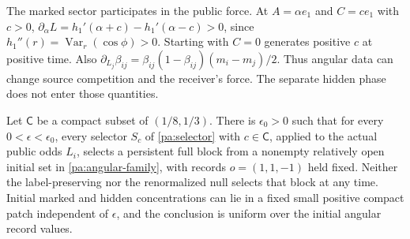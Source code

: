 The marked sector participates in the public force. At $A=\alpha e_1$ and $C=ce_1$ with $c>0$, $\partial_\alpha L=h_1'(\alpha+c)-h_1'(\alpha-c)>0$, since $h_1''(r)=\operatorname{Var}_r(\cos\phi)>0$. Starting with $C=0$ generates positive $c$ at positive time. Also $\partial_{L_j}\beta_{ij}=\beta_{ij}(1-\beta_{ij})(m_i-m_j)/2$. Thus angular data can change source competition and the receiver's force. The separate hidden phase does not enter those quantities.

Let $\mathsf C$ be a compact subset of $(1/8,1/3)$. There is $\epsilon_0>0$ such that for every $0<\epsilon<\epsilon_0$, every selector $S_c$ of \cref{pa:selector} with $c\in\mathsf C$, applied to the actual public odds $L_i$, selects a persistent full block from a nonempty relatively open initial set in \cref{pa:angular-family}, with records $o=(1,1,-1)$ held fixed. Neither the label-preserving nor the renormalized null selects that block at any time. Initial marked and hidden concentrations can lie in a fixed small positive compact patch independent of $\epsilon$, and the conclusion is uniform over the initial angular record values.
